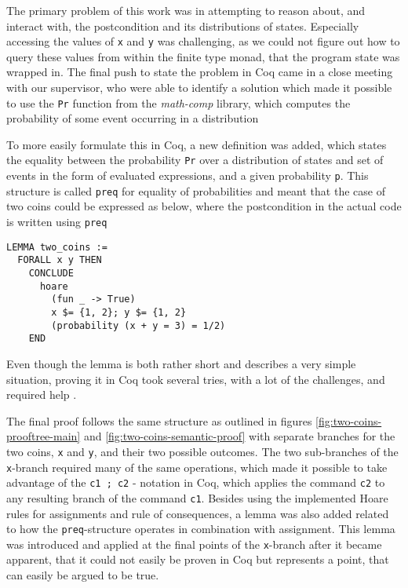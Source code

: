 The primary problem of this work was in attempting to reason about, and interact with, the postcondition and its distributions of states. Especially accessing the values of \texttt{x} and \texttt{y} was challenging, as we could not figure out how to query these values from within the finite type monad, that the program state was wrapped in. The final push to state the problem in Coq came in a close meeting with our supervisor, who were able to identify a solution which made it possible to use the \texttt{Pr} function from the \textit{math-comp} library, which computes the probability of some event occurring in a distribution

To more easily formulate this in Coq, a new definition was added, which states the equality between the probability \texttt{Pr} over a distribution of states and set of events in the form of evaluated expressions, and a given probability \texttt{p}. This structure is called \texttt{preq} for equality of probabilities and meant that the case of two coins could be expressed as below, where the postcondition in the actual code is written using \texttt{preq}


\begin{verbatim}
LEMMA two_coins := 
  FORALL x y THEN
    CONCLUDE 
      hoare
        (fun _ -> True)
        x $= {1, 2}; y $= {1, 2}
        (probability (x + y = 3) = 1/2)
    END 
\end{verbatim}


Even though the lemma is both rather short and describes a very simple situation, proving it in Coq took several tries, with a lot of the challenges, and required help .

The final proof follows the same structure as outlined in figures \ref{fig:two-coins-prooftree-main} and \ref{fig:two-coins-semantic-proof} with separate branches for the two coins, \texttt{x} and \texttt{y}, and their two possible outcomes. The two sub-branches of the \texttt{x}-branch required many of the same operations, which made it possible to take advantage of the \texttt{c1 ; c2} - notation in Coq, which applies the command \texttt{c2} to any resulting branch of the command \texttt{c1}. Besides using the implemented Hoare rules for assignments and rule of consequences, a lemma was also added related to how the \texttt{preq}-structure operates in combination with assignment. This lemma was introduced and applied at the final points of the \texttt{x}-branch after it became apparent, that it could not easily be proven in Coq but represents a point, that can easily be argued to be true.

